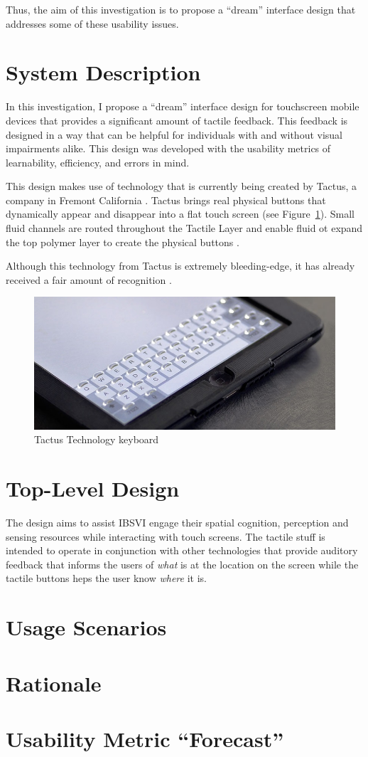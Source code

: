 \documentclass[11pt]{article}
\begin{document}
Thus, the aim of this investigation is to propose a ``dream'' interface design that addresses some of these usability issues.


\section{System Description}
\label{System Description}

In this investigation, I propose a ``dream'' interface design for touchscreen mobile devices that provides a significant amount of tactile feedback. This feedback is designed in a way that can be helpful for individuals with and without visual impairments alike. This design was developed with the usability metrics of learnability, efficiency, and errors in mind.

This design makes use of technology that is currently being created by Tactus, a company in Fremont California \cite{Tactus}. Tactus brings real physical buttons that dynamically appear and disappear into a flat touch screen (see Figure~\ref{tactus}). Small fluid channels are routed throughout the Tactile Layer and enable fluid ot expand the top polymer layer to create the physical buttons \cite{Tactus}.

Although this technology from Tactus is extremely bleeding-edge, it has already received a fair amount of recognition \cite{CNN, I-Zone, PCMag}. 

\begin{figure}[ht]
\centering
\includegraphics[width=4.5in]{tactus1.jpg} 
\caption{Tactus Technology keyboard}
\label{tactus}
\end{figure}

\section{Top-Level Design}
The design aims to assist IBSVI engage their spatial cognition, perception and sensing resources while interacting with touch screens. The tactile stuff is intended to operate in conjunction with other technologies that provide auditory feedback that informs the users of \textit{what} is at the location on the screen while the tactile buttons heps the user know \textit{where} it is. 
\label{background}

\section{Usage Scenarios}

\section{Rationale}


\section{Usability Metric ``Forecast''}
\clearpage


{}

\end{document}
